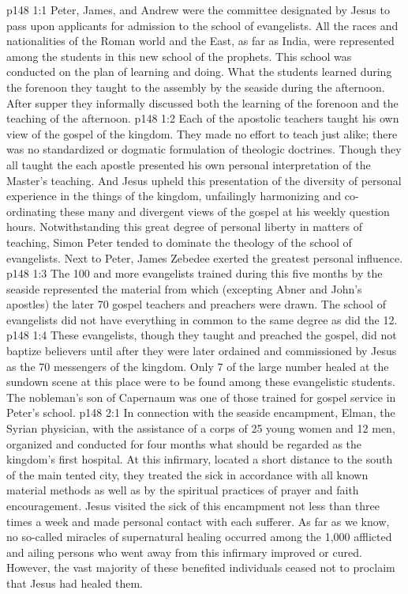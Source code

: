 \vs p148 1:1 Peter, James, and Andrew were the committee designated by Jesus to pass upon applicants for admission to the school of evangelists. All the races and nationalities of the Roman world and the East, as far as India, were represented among the students in this new school of the prophets. This school was conducted on the plan of learning and doing. What the students learned during the forenoon they taught to the assembly by the seaside during the afternoon. After supper they informally discussed both the learning of the forenoon and the teaching of the afternoon.
\vs p148 1:2 Each of the apostolic teachers taught his own view of the gospel of the kingdom. They made no effort to teach just alike; there was no standardized or dogmatic formulation of theologic doctrines. Though they all taught the  each apostle presented his own personal interpretation of the Master’s teaching. And Jesus upheld this presentation of the diversity of personal experience in the things of the kingdom, unfailingly harmonizing and co\hyp{}ordinating these many and divergent views of the gospel at his weekly question hours. Notwithstanding this great degree of personal liberty in matters of teaching, Simon Peter tended to dominate the theology of the school of evangelists. Next to Peter, James Zebedee exerted the greatest personal influence.
\vs p148 1:3 The 100 and more evangelists trained during this five months by the seaside represented the material from which (excepting Abner and John’s apostles) the later 70 gospel teachers and preachers were drawn. The school of evangelists did not have everything in common to the same degree as did the 12.
\vs p148 1:4 These evangelists, though they taught and preached the gospel, did not baptize believers until after they were later ordained and commissioned by Jesus as the 70 messengers of the kingdom. Only 7 of the large number healed at the sundown scene at this place were to be found among these evangelistic students. The nobleman’s son of Capernaum was one of those trained for gospel service in Peter’s school.
\vs p148 2:1 In connection with the seaside encampment, Elman, the Syrian physician, with the assistance of a corps of 25 young women and 12 men, organized and conducted for four months what should be regarded as the kingdom’s first hospital. At this infirmary, located a short distance to the south of the main tented city, they treated the sick in accordance with all known material methods as well as by the spiritual practices of prayer and faith encouragement. Jesus visited the sick of this encampment not less than three times a week and made personal contact with each sufferer. As far as we know, no so\hyp{}called miracles of supernatural healing occurred among the 1,000 afflicted and ailing persons who went away from this infirmary improved or cured. However, the vast majority of these benefited individuals ceased not to proclaim that Jesus had healed them.
